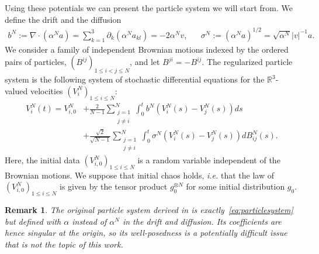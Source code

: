 \documentclass[11pt,a4paper]{article}
\theoremstyle{definition}
\theoremstyle{plain}
\newtheorem{remark}[defi]{Remark}
\begin{document}
Using these potentials we can present the particle system we will start from. We define the drift and the diffusion
\begin{align*}
b^N:=\nabla\cdot(\alpha^Na)=\sum_{k=1}^3\partial_k(\alpha^Na_{kl})=-2\alpha^N v,&&\sigma^N:=\left(\alpha^N a\right)^{1/2}=\sqrt{\alpha^N} \vert v\vert^{-1} a.
\end{align*}We consider a family of independent Brownian motions indexed by the ordered pairs of particles, $(B^{ij})_{1 \leq i<j \leq N}$, and let $B^{ji} = - B^{ij}$. The regularized particle system is the following system of stochastic differential equations for the $\mathbb{R}^3$-valued velocities $(V^N_i)_{1\leq i \leq N} $:
\begin{align}
    \label{eq:particlesystem}
    V^N_i (t) = V^N_{i,0} &+ \frac{2}{N-1}  \sum_{\substack{j=1 \\ j \neq i}}^N \int_0^t b^N(V^N_i(s) - V^N_j(s)) ds\nonumber
    \\&+ \frac{\sqrt{2}}{\sqrt{N-1}} \sum_{\substack{j=1 \\ j \neq i}}^N \int_0^t\sigma^N(V^N_i(s) - V^N_j(s)) dB^{N}_{ij}(s).
\end{align}
Here, the initial data $(V^N_{i,0})_{1\leq i \leq N}$ is a random variable independent of the Brownian motions. We suppose that initial chaos holds, \textit{i.e.} that the law of $(V^N_{i,0})_{1\leq i \leq N}$ is given by the tensor product $g_0^{\otimes N}$ for some initial distribution $g_0$.
\begin{remark}
    The original particle system derived in \cite{MiotPulvirentiSaffirio2011, Carrapatoso2015} is exactly~\eqref{eq:particlesystem} but defined with $\alpha$ instead of $\alpha^N$ in the drift and diffusion. Its coefficients are hence singular at the origin, so its well-posedness is a potentially difficult issue that is not the topic of this work.
\end{remark}
\end{document}
